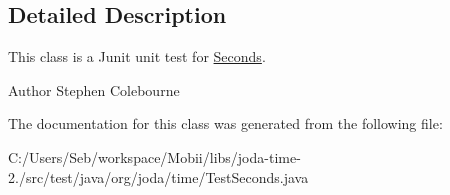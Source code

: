 \subsection{Detailed Description}
This class is a Junit unit test for \hyperlink{classorg_1_1joda_1_1time_1_1_seconds}{Seconds}.

\begin{DoxyAuthor}{Author}
Stephen Colebourne 
\end{DoxyAuthor}


The documentation for this class was generated from the following file\-:\begin{DoxyCompactItemize}
\item 
C\-:/\-Users/\-Seb/workspace/\-Mobii/libs/joda-\/time-\/2./src/test/java/org/joda/time/Test\-Seconds.\-java\end{DoxyCompactItemize}

